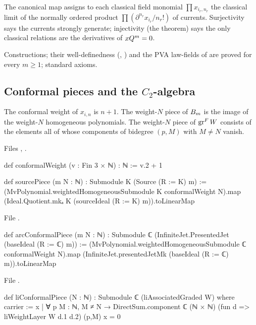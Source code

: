 \begin{physics}
The canonical map assigns to each classical field monomial $\prod x_{i_r,n_r}$ the classical limit of the
normally ordered product $\prod(\partial^{n_r}x_{i_r}/n_r!)$ of currents. Surjectivity says the currents
strongly generate; injectivity (the theorem) says the only classical relations are the derivatives of
$xQ^m=0$.
\end{physics}

\begin{status}
Constructions; their well-definedness (, ) and the PVA
law-fields of  are proved for every $m\ge1$; standard axioms.
\end{status}

\subsection{Conformal pieces and the $C_2$-algebra}

\begin{definition}\label{l20:def:conformal}
The conformal weight of $x_{i,n}$ is $n+1$. The weight-$N$ piece of $B_m$ is the image of the
weight-$N$ homogeneous polynomials. The weight-$N$ piece of $\operatorname{gr}^F W$ consists of the elements all of whose
components of bidegree $(p,M)$ with $M\neq N$ vanish.
\end{definition}
\noindent Files ,
.
\begin{leancode}
def conformalWeight (v : Fin 3 × ℕ) : ℕ := v.2 + 1

def sourcePiece (m N : ℕ) : Submodule K (Source (R := K) m) :=
  (MvPolynomial.weightedHomogeneousSubmodule K conformalWeight N).map
    (Ideal.Quotient.mkₐ K (sourceIdeal (R := K) m)).toLinearMap
\end{leancode}
\noindent File .
\begin{leancode}
def arcConformalPiece (m N : ℕ) :
    Submodule ℂ (InfiniteJet.PresentedJet (baseIdeal (R := ℂ) m)) :=
  (MvPolynomial.weightedHomogeneousSubmodule ℂ conformalWeight N).map
    (InfiniteJet.presentedJetMk (baseIdeal (R := ℂ) m)).toLinearMap
\end{leancode}
\noindent File .
\begin{leancode}
def liConformalPiece (N : ℕ) : Submodule ℂ (liAssociatedGraded W) where
  carrier := {x | ∀ p M : ℕ, M ≠ N →
    DirectSum.component ℂ (ℕ × ℕ) (fun d => liWeightLayer W d.1 d.2) (p,M) x = 0}
\end{leancode}

